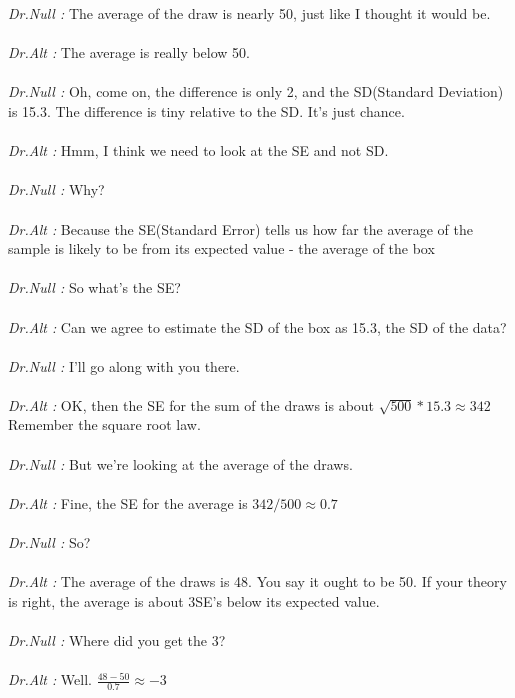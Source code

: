 \documentclass[12pt, oneside]{article}
\begin{document}
 \par
 \textit{Dr.Null : }The average of the draw is nearly 50, just like I thought it would be.\\\\
 \textit{Dr.Alt : }The average is really below 50.\\\\
 \textit{Dr.Null : }Oh, come on, the difference is only 2, and the SD(Standard Deviation) is 15.3. The difference is tiny relative to the SD. It's just chance. \\\\
 \textit{Dr.Alt : }Hmm, I think we need to look at the SE and not SD. \\\\
 \textit{Dr.Null : }Why? \\\\
 \textit{Dr.Alt : }Because the SE(Standard Error) tells us how far the average of the sample is likely to be from its expected value - the average of the box\\\\
 \textit{Dr.Null : }So what's the SE?\\\\
 \textit{Dr.Alt : }Can we agree to estimate the SD of the box as 15.3, the SD of the data?\\\\
 \textit{Dr.Null : }I'll go along with you there.\\\\
 \textit{Dr.Alt : }OK, then the SE for the sum of the draws is about $\sqrt{500}*15.3 \approx 342$ Remember the square root law.\\\\
 \textit{Dr.Null : }But we're looking at the average of the draws.\\\\
 \textit{Dr.Alt : }Fine, the SE for the average is $342/500 \approx 0.7$\\\\ \textit{Dr.Null : }So?\\\\
 \textit{Dr.Alt : }The average of the draws is 48. You say it ought to be 50. If your theory is right, the average is about 3SE's below its expected value.\\\\
 \textit{Dr.Null : }Where did you get the 3?\\\\
 \textit{Dr.Alt : }Well. $\frac{48-50}{0.7} \approx -3$\\\\
\end{document}
